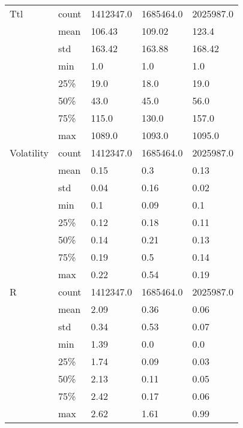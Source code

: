 \begin{tabular}{lllll}
Ttl & count &  1412347.0 &  1685464.0 &  2025987.0 \\
  & mean &     106.43 &     109.02 &      123.4 \\
  & std &     163.42 &     163.88 &     168.42 \\
  & min &        1.0 &        1.0 &        1.0 \\
  & 25\% &       19.0 &       18.0 &       19.0 \\
  & 50\% &       43.0 &       45.0 &       56.0 \\
  & 75\% &      115.0 &      130.0 &      157.0 \\
  & max &     1089.0 &     1093.0 &     1095.0 \\
Volatility & count &  1412347.0 &  1685464.0 &  2025987.0 \\
  & mean &       0.15 &        0.3 &       0.13 \\
  & std &       0.04 &       0.16 &       0.02 \\
  & min &        0.1 &       0.09 &        0.1 \\
  & 25\% &       0.12 &       0.18 &       0.11 \\
  & 50\% &       0.14 &       0.21 &       0.13 \\
  & 75\% &       0.19 &        0.5 &       0.14 \\
  & max &       0.22 &       0.54 &       0.19 \\
R & count &  1412347.0 &  1685464.0 &  2025987.0 \\
  & mean &       2.09 &       0.36 &       0.06 \\
  & std &       0.34 &       0.53 &       0.07 \\
  & min &       1.39 &        0.0 &        0.0 \\
  & 25\% &       1.74 &       0.09 &       0.03 \\
  & 50\% &       2.13 &       0.11 &       0.05 \\
  & 75\% &       2.42 &       0.17 &       0.06 \\
  & max &       2.62 &       1.61 &       0.99 \\
\bottomrule
\end{tabular}
